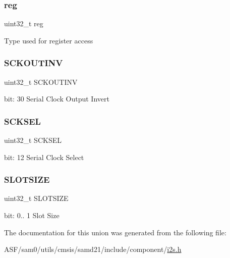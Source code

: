 \subsubsection{\texorpdfstring{reg}{reg}}
{\footnotesize\ttfamily uint32\+\_\+t reg}

Type used for register access \mbox{\label{union_i2_s___c_l_k_c_t_r_l___type_a4dea2b011beabae3f973b59fa4d2020c}} 
\subsubsection{\texorpdfstring{SCKOUTINV}{SCKOUTINV}}
{\footnotesize\ttfamily uint32\+\_\+t S\+C\+K\+O\+U\+T\+I\+NV}

bit\+: 30 Serial Clock Output Invert \mbox{\label{union_i2_s___c_l_k_c_t_r_l___type_a7f1984221593a52eac95842409da0822}} 
\subsubsection{\texorpdfstring{SCKSEL}{SCKSEL}}
{\footnotesize\ttfamily uint32\+\_\+t S\+C\+K\+S\+EL}

bit\+: 12 Serial Clock Select \mbox{\label{union_i2_s___c_l_k_c_t_r_l___type_adb480f7ea911de6edf97e220e66145fe}} 
\subsubsection{\texorpdfstring{SLOTSIZE}{SLOTSIZE}}
{\footnotesize\ttfamily uint32\+\_\+t S\+L\+O\+T\+S\+I\+ZE}

bit\+: 0.. 1 Slot Size 

The documentation for this union was generated from the following file\+:\begin{DoxyCompactItemize}
\item 
A\+S\+F/sam0/utils/cmsis/samd21/include/component/\mbox{\hyperlink{component_2i2s_8h}{i2s.\+h}}\end{DoxyCompactItemize}
